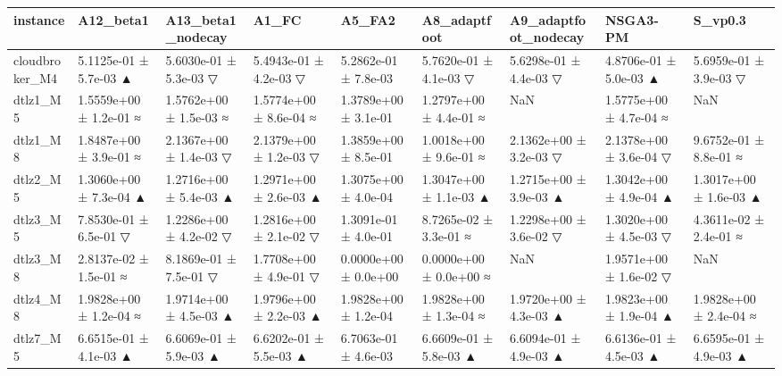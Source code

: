 \begin{tabular}{lllllllll}
\toprule
instance & A12\_beta1 & A13\_beta1\_nodecay & A1\_FC & A5\_FA2 & A8\_adaptfoot & A9\_adaptfoot\_nodecay & NSGA3-PM & S\_vp0.3 \\
\midrule
cloudbroker\_M4 & 5.1125e-01 ± 5.7e-03 ▲ & 5.6030e-01 ± 5.3e-03 ▽ & 5.4943e-01 ± 4.2e-03 ▽ & 5.2862e-01 ± 7.8e-03 & 5.7620e-01 ± 4.1e-03 ▽ & 5.6298e-01 ± 4.4e-03 ▽ & 4.8706e-01 ± 5.0e-03 ▲ & 5.6959e-01 ± 3.9e-03 ▽ \\
dtlz1\_M5 & 1.5559e+00 ± 1.2e-01 ≈ & 1.5762e+00 ± 1.5e-03 ≈ & 1.5774e+00 ± 8.6e-04 ≈ & 1.3789e+00 ± 3.1e-01 & 1.2797e+00 ± 4.4e-01 ≈ & NaN & 1.5775e+00 ± 4.7e-04 ≈ & NaN \\
dtlz1\_M8 & 1.8487e+00 ± 3.9e-01 ≈ & 2.1367e+00 ± 1.4e-03 ▽ & 2.1379e+00 ± 1.2e-03 ▽ & 1.3859e+00 ± 8.5e-01 & 1.0018e+00 ± 9.6e-01 ≈ & 2.1362e+00 ± 3.2e-03 ▽ & 2.1378e+00 ± 3.6e-04 ▽ & 9.6752e-01 ± 8.8e-01 ≈ \\
dtlz2\_M5 & 1.3060e+00 ± 7.3e-04 ▲ & 1.2716e+00 ± 5.4e-03 ▲ & 1.2971e+00 ± 2.6e-03 ▲ & 1.3075e+00 ± 4.0e-04 & 1.3047e+00 ± 1.1e-03 ▲ & 1.2715e+00 ± 3.9e-03 ▲ & 1.3042e+00 ± 4.9e-04 ▲ & 1.3017e+00 ± 1.6e-03 ▲ \\
dtlz3\_M5 & 7.8530e-01 ± 6.5e-01 ▽ & 1.2286e+00 ± 4.2e-02 ▽ & 1.2816e+00 ± 2.1e-02 ▽ & 1.3091e-01 ± 4.0e-01 & 8.7265e-02 ± 3.3e-01 ≈ & 1.2298e+00 ± 3.6e-02 ▽ & 1.3020e+00 ± 4.5e-03 ▽ & 4.3611e-02 ± 2.4e-01 ≈ \\
dtlz3\_M8 & 2.8137e-02 ± 1.5e-01 ≈ & 8.1869e-01 ± 7.5e-01 ▽ & 1.7708e+00 ± 4.9e-01 ▽ & 0.0000e+00 ± 0.0e+00 & 0.0000e+00 ± 0.0e+00 ≈ & NaN & 1.9571e+00 ± 1.6e-02 ▽ & NaN \\
dtlz4\_M8 & 1.9828e+00 ± 1.2e-04 ≈ & 1.9714e+00 ± 4.5e-03 ▲ & 1.9796e+00 ± 2.2e-03 ▲ & 1.9828e+00 ± 1.2e-04 & 1.9828e+00 ± 1.3e-04 ≈ & 1.9720e+00 ± 4.3e-03 ▲ & 1.9823e+00 ± 1.9e-04 ▲ & 1.9828e+00 ± 2.4e-04 ≈ \\
dtlz7\_M5 & 6.6515e-01 ± 4.1e-03 ▲ & 6.6069e-01 ± 5.9e-03 ▲ & 6.6202e-01 ± 5.5e-03 ▲ & 6.7063e-01 ± 4.6e-03 & 6.6609e-01 ± 5.8e-03 ▲ & 6.6094e-01 ± 4.9e-03 ▲ & 6.6136e-01 ± 4.5e-03 ▲ & 6.6595e-01 ± 4.9e-03 ▲ \\
\bottomrule
\end{tabular}

